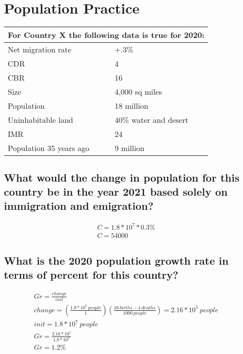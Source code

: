 \documentclass{article}
\begin{document}
\section{Population Practice}

\begin{center}
\begin{tabular}{p{4.5cm}|p{4.5cm}}
    \toprule
    \multicolumn{2}{p{9cm}}{For Country X the following data is true for 2020:} \\
    \midrule
    Net migration rate & +.3\% \\
    CDR & 4 \\
    CBR & 16 \\
    Size & 4,000 sq miles \\
    Population & 18 million \\
    Uninhabitable land & 40\% water and desert \\
    IMR & 24 \\
    Population 35 years ago & 9 million \\
    \bottomrule
\end{tabular}
\end{center}

\subsection{What would the change in population for this country be in the year
2021 based solely on immigration and emigration?}

\begin{gather}
    C = 1.8*10^7 * 0.3\% \\
    C = 54000
\end{gather}

\subsection{What is the 2020 population growth rate in terms of percent for
this country?}

\begin{gather}
    Gr = \frac{change}{init} \\
    change = \left(\frac{1.8*10^7 \ people}{1}\right) \left(\frac{16\ births - 4\ deaths}{1000\ people}\right) = 2.16*10^5 \ people \\
    init = 1.8 * 10^7 \ people \\
    Gr = \frac{2.16*10^5}{1.8 * 10^7} \\
    Gr = 1.2\%
\end{gather}
\end{document}
